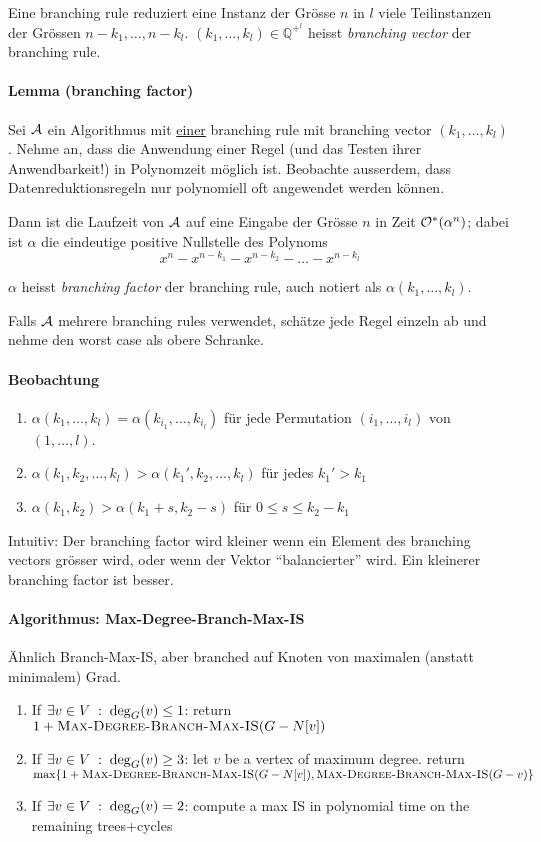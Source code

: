 Eine branching rule reduziert eine Instanz der Grösse $n$ in $l$ viele Teilinstanzen der Grössen $n-k_1, \dots, n-k_l$.
$(k_1, \dots, k_l) \in \mathbb{Q}^{+^l}$ heisst \emph{branching vector} der branching rule.

\paragraph{Lemma (branching factor)}
Sei $\mathcal{A}$ ein Algorithmus mit \underline{einer} branching rule mit branching vector $(k_1, \dots, k_l)$.
Nehme an, dass die Anwendung einer Regel (und das Testen ihrer Anwendbarkeit!) in Polynomzeit möglich ist.
Beobachte ausserdem, dass Datenreduktionsregeln nur polynomiell oft angewendet werden können.

Dann ist die Laufzeit von $\mathcal{A}$ auf eine Eingabe der Grösse $n$ in Zeit $\mathcal{O}^*(\alpha^n)$;
dabei ist $\alpha$ die eindeutige positive Nullstelle des Polynoms
$$ x^n - x^{n-k_1} - x^{n-k_2} - \dots - x^{n-k_l} $$

$\alpha$ heisst \emph{branching factor} der branching rule, auch notiert als $\alpha(k_1, \dots, k_l)$.

Falls $\mathcal{A}$ mehrere branching rules verwendet, schätze jede Regel einzeln ab und nehme den worst case als obere Schranke.

\paragraph{Beobachtung}
\begin{enumerate}[label=(\alph*)]
    \item $ \alpha(k_1, \dots, k_l) = \alpha(k_{i_1}, \dots, k_{i_l}) $ für jede Permutation $(i_1, \dots, i_l)$
    von $(1, \dots, l)$.
    \item $ \alpha(k_1, k_2, \dots, k_l) > \alpha(k_1', k_2, \dots, k_l)$ für jedes $k_1' > k_1$
    \item $ \alpha(k_1, k_2) > \alpha(k_1+s, k_2-s)$ für $0 \leq s \leq k_2 - k_1$
\end{enumerate}
Intuitiv: Der branching factor wird kleiner wenn ein Element des branching vectors grösser wird,
oder wenn der Vektor ``balancierter'' wird.
Ein kleinerer branching factor ist besser.

\paragraph{Algorithmus: Max-Degree-Branch-Max-IS}
Ähnlich Branch-Max-IS, aber branched auf Knoten von maximalen (anstatt minimalem) Grad.
{
\newcommand{\algo}{\textsc{Max-Degree-Branch-Max-IS}}
\begin{enumerate}
    \item If $\exists v \in V \; : \; \deg_G(v) \leq 1$: return $ 1+ \algo(G-N[v]) $
    \item If $\exists v \in V \; : \; \deg_G(v) \geq 3$: let $v$ be a vertex of maximum degree. return \\
    $ \max \{ 1 + \algo(G-N[v]), \algo(G-v) \} $
    \item If $\exists v \in V \; : \; \deg_G(v) = 2$: compute a max IS in polynomial time on the remaining trees+cycles
\end{enumerate}
}

